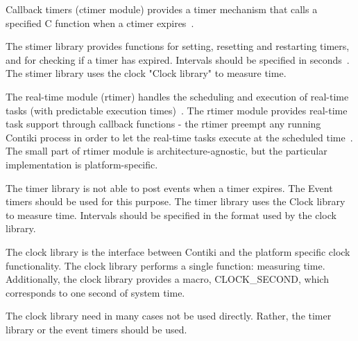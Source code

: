 Callback timers (ctimer module) provides a timer mechanism that calls a specified
C function when a ctimer expires~\cite{contiki-docs}.

The stimer library provides functions for setting, resetting and
restarting timers, and for checking if a timer has expired.
Intervals should be specified in seconds~\cite{contiki-docs}.
The stimer library uses the clock "Clock library" to
measure time.

The real-time module (rtimer) handles the scheduling and execution of
real-time tasks (with predictable execution times)~\cite{contiki-docs}.
The rtimer module provides real-time task support through callback functions -
the rtimer preempt any running Contiki process in order to let the real-time tasks
execute at the scheduled time~\cite{contiki-wiki-timers}.
The small part of rtimer module is architecture-agnostic,
but the particular implementation is platform-specific.




The timer library is not able to post events when a timer expires. The Event timers should be used for this purpose.
The timer library uses the Clock library to measure time. Intervals should be specified in the format used by the clock library.

The clock library is the interface between Contiki and the platform specific clock functionality.
The clock library performs a single function: measuring time.
Additionally, the clock library provides a macro, CLOCK\_SECOND, which corresponds to one second of system time.

The clock library need in many cases not be used directly. Rather, the timer library or the event timers should be used.
